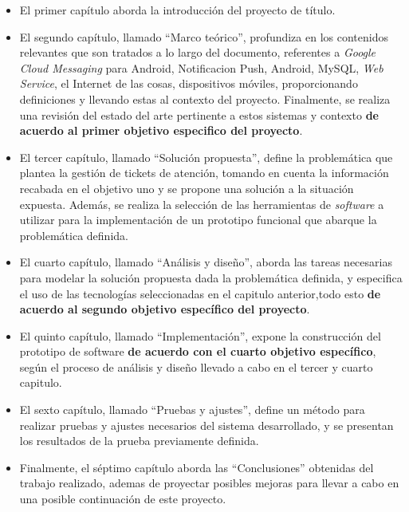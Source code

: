 \begin{itemize}
\item El primer capítulo aborda la introducción del proyecto de título.

\item El segundo capítulo, llamado ``Marco teórico'', profundiza en los contenidos relevantes que son tratados a lo largo del documento, referentes a \textit{Google Cloud Messaging} para Android, Notificacion Push, Android, MySQL, \textit{Web Service}, el Internet de las cosas, dispositivos móviles, proporcionando definiciones y llevando estas al contexto del proyecto. Finalmente, se realiza una revisión del estado del arte pertinente a estos sistemas y contexto \textbf{de acuerdo al primer objetivo especifico del proyecto}.

\item El tercer capítulo, llamado ``Solución propuesta'', define la problemática que plantea la gestión de tickets de atención, tomando en cuenta la información recabada en el objetivo uno y se propone una solución a la situación expuesta. Además, se realiza la selección de las herramientas de \textit{software} a utilizar para la implementación de un prototipo funcional que abarque la problemática definida.

\item El cuarto capítulo, llamado ``Análisis y diseño'', aborda las tareas necesarias para modelar la solución propuesta dada la problemática definida, y especifica el uso de las tecnologías seleccionadas en el capitulo anterior,todo esto \textbf{de acuerdo al segundo objetivo específico del proyecto}.

\item El quinto capítulo, llamado ``Implementación'', expone la construcción del prototipo de software \textbf{de acuerdo con el cuarto objetivo específico}, según el proceso de análisis y diseño llevado a cabo en el tercer y cuarto capitulo.

\item El sexto capítulo, llamado ``Pruebas y ajustes'', define un método para realizar pruebas y ajustes necesarios del sistema desarrollado, y se presentan los resultados de la prueba previamente definida.

\item Finalmente, el séptimo capítulo aborda las ``Conclusiones'' obtenidas del trabajo realizado, ademas de proyectar posibles mejoras para llevar a cabo en una posible continuación de este proyecto.

\end{itemize}




